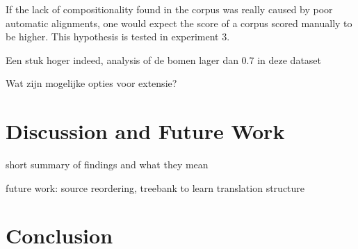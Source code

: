 \documentclass{report}
\theoremstyle{definition}
\theoremstyle{plain}
\begin{document}
If the lack of compositionality found in the corpus was really caused by poor automatic alignments, one would expect the score of a corpus scored manually to be higher. This hypothesis is tested in experiment 3.

Een stuk hoger indeed, analysis of de bomen lager dan 0.7 in deze dataset

Wat zijn mogelijke opties voor extensie?

\chapter{Discussion and Future Work}

short summary of findings and what they mean

future work: source reordering, treebank to learn translation structure


\chapter{Conclusion}
















\end{document}
